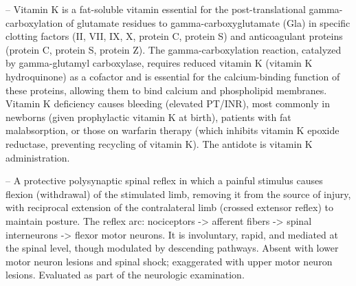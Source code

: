 -- Vitamin K is a fat-soluble vitamin essential for the post-translational gamma-carboxylation of glutamate residues to gamma-carboxyglutamate (Gla) in specific clotting factors (II, VII, IX, X, protein C, protein S) and anticoagulant proteins (protein C, protein S, protein Z). The gamma-carboxylation reaction, catalyzed by gamma-glutamyl carboxylase, requires reduced vitamin K (vitamin K hydroquinone) as a cofactor and is essential for the calcium-binding function of these proteins, allowing them to bind calcium and phospholipid membranes. Vitamin K deficiency causes bleeding (elevated PT/INR), most commonly in newborns (given prophylactic vitamin K at birth), patients with fat malabsorption, or those on warfarin therapy (which inhibits vitamin K epoxide reductase, preventing recycling of vitamin K). The antidote is vitamin K administration.

-- A protective polysynaptic spinal reflex in which a painful stimulus causes flexion (withdrawal) of the stimulated limb, removing it from the source of injury, with reciprocal extension of the contralateral limb (crossed extensor reflex) to maintain posture. The reflex arc: nociceptors -> afferent fibers -> spinal interneurons -> flexor motor neurons. It is involuntary, rapid, and mediated at the spinal level, though modulated by descending pathways. Absent with lower motor neuron lesions and spinal shock; exaggerated with upper motor neuron lesions. Evaluated as part of the neurologic examination.

